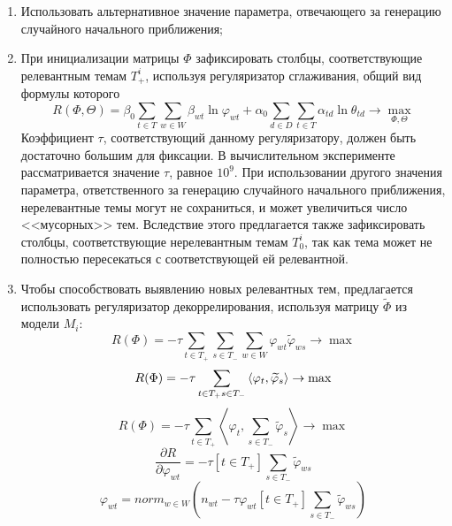 \documentclass{article}
\begin{document}
\begin{enumerate}
    \item Использовать альтернативное значение параметра, отвечающего за генерацию случайного начального приближения;
    \item При инициализации матрицы $\Phi$ зафиксировать столбцы, соответствующие релевантным темам $T_+^i$, используя регуляризатор сглаживания, общий вид формулы которого \citep{SukVor19}
    \begin{equation}
        R (\Phi, \Theta) = \beta_0 \sum \limits_{t \in T} \sum \limits_{w \in W} \beta_{wt} \ln \varphi_{wt} + \alpha_0 \sum \limits_{d \in D} \sum \limits_{t \in T} \alpha_{td} \ln \theta_{td} \to \max \limits_{\Phi, \Theta}
    \end{equation}
    Коэффициент $\tau$, соответствующий данному регуляризатору, должен быть достаточно большим для фиксации. В вычислительном эксперименте рассматривается значение $\tau$, равное ${10}^9$. 
    При использовании другого значения параметра, ответственного за генерацию случайного начального приближения, нерелевантные темы могут не сохраниться, и может увеличиться число <<мусорных>> тем.
    Вследствие этого предлагается также зафиксировать столбцы, соответствующие нерелевантным темам $T_0^i$, так как тема может не полностью пересекаться с соответствующей ей релевантной.
    \item Чтобы способствовать выявлению новых релевантных тем, предлагается использовать регуляризатор декоррелирования, используя матрицу $\widetilde{\Phi}$ из модели $M_i$:
    \begin{equation}
        R(\Phi) = -\tau \sum \limits_{t \in T_+} \sum \limits_{s \in T_-} \sum \limits_{w \in W} \varphi_{wt} \widetilde{\varphi}_{ws} \to \max
    \end{equation}
    \begin{equation}
        R(\Phi) = -\tau \sum \limits_{t \in T_+ \\ s \in T_-} \left\langle \varphi_t, \widetilde{\varphi}_s \right\rangle \to \max
    \end{equation}
    \begin{equation}
        R(\Phi) = -\tau \sum \limits_{t \in T_+} \left\langle \varphi_t, \sum \limits_{s \in T_-} \widetilde{\varphi}_s \right\rangle \to \max
    \end{equation}
    \begin{equation}
        \frac{\partial R}{\partial \varphi_{wt}} = -\tau [t \in T_+] \sum \limits_{s \in T_-} \widetilde{\varphi}_{ws}
    \end{equation}
    \begin{equation}
        \varphi_{wt} = {norm}_{w \in W} \left(n_{wt} - \tau \varphi_{wt} [t \in T_+] \sum \limits_{s \in T_-} \widetilde{\varphi}_{ws}\right)
    \end{equation}
\end{enumerate}
\end{document}
